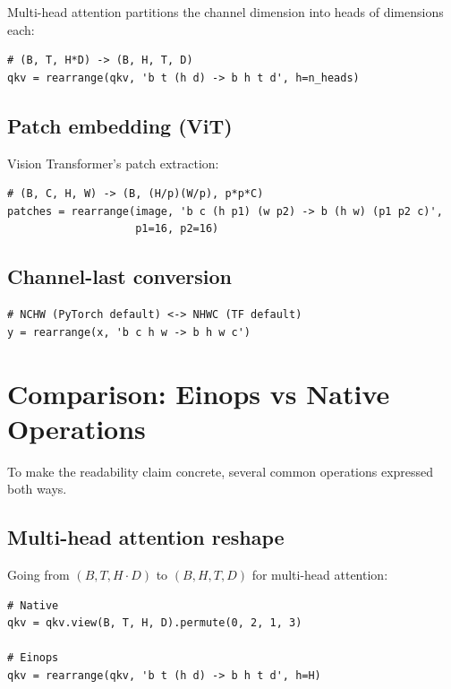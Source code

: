 Multi-head attention partitions the channel dimension into
 heads of  dimensions each:

\begin{lstlisting}[style=lucid,language=LucidPython]
# (B, T, H*D) -> (B, H, T, D)
qkv = rearrange(qkv, 'b t (h d) -> b h t d', h=n_heads)
\end{lstlisting}

\subsection{Patch embedding (ViT)}
\label{ssec:einops:patch_embed}

Vision Transformer's patch extraction:

\begin{lstlisting}[style=lucid,language=LucidPython]
# (B, C, H, W) -> (B, (H/p)(W/p), p*p*C)
patches = rearrange(image, 'b c (h p1) (w p2) -> b (h w) (p1 p2 c)',
                    p1=16, p2=16)
\end{lstlisting}

\subsection{Channel-last conversion}
\label{ssec:einops:nhwc}

\begin{lstlisting}[style=lucid,language=LucidPython]
# NCHW (PyTorch default) <-> NHWC (TF default)
y = rearrange(x, 'b c h w -> b h w c')
\end{lstlisting}

\section{Comparison: Einops vs Native Operations}
\label{sec:einops:vs_native}

To make the readability claim concrete, several common operations
expressed both ways.

\subsection{Multi-head attention reshape}
\label{ssec:einops:mha_compare}

Going from $(B, T, H \cdot D)$ to $(B, H, T, D)$ for multi-head
attention:

\begin{lstlisting}[style=lucid,language=LucidPython]
# Native
qkv = qkv.view(B, T, H, D).permute(0, 2, 1, 3)

# Einops
qkv = rearrange(qkv, 'b t (h d) -> b h t d', h=H)
\end{lstlisting}

